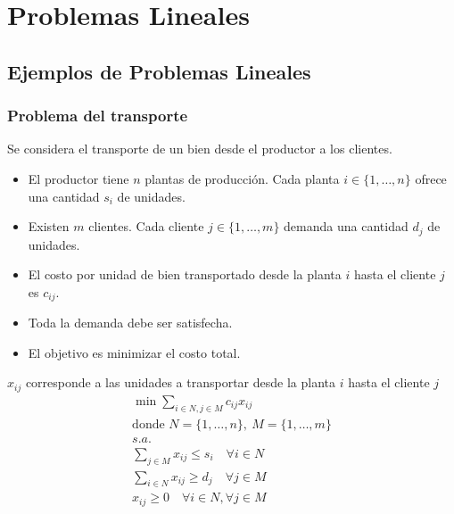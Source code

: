 \documentclass[../main.tex]{subfiles}
\begin{document}
\section{Problemas Lineales}
\subsection{Ejemplos de Problemas Lineales}
\subsubsection{Problema del transporte}
Se considera el transporte de un bien desde el productor a los clientes.\\
\begin{minipage}[t]{.45\textwidth}
  \begin{itemize}
    \item El productor tiene $n$ plantas de producción. Cada planta $i \in \{ 1, \ldots, n \}$ ofrece una cantidad $s_i$ de unidades.
    \item Existen $m$ clientes. Cada cliente $j \in \{ 1, \ldots, m \}$ demanda una cantidad $d_j$ de unidades.
    \item El costo por unidad de bien transportado desde la planta $i$ hasta el cliente $j$ es $c_{ij}$.
    \item Toda la demanda debe ser satisfecha.
    \item El objetivo es minimizar el costo total.
  \end{itemize}
\end{minipage}
\hfill
\begin{minipage}[t]{.45\textwidth}
  $x_{ij}$ corresponde a las unidades a transportar desde la planta $i$ hasta el cliente $j$
  \begin{gather*}
    \min \sum_{i \in N, j \in M} c_{ij} x_{ij} \\
    \text{donde } N = \{ 1, \ldots, n \},\ M = \{ 1, \ldots, m \}\\
    s.a.\\
    \sum_{j \in M} x_{ij} \leq s_i \quad \forall i \in N\\
    \sum_{i \in N} x_{ij} \geq d_j \quad \forall j \in M\\
    x_{ij} \geq 0 \quad \forall i \in N, \forall j \in M
  \end{gather*}
\end{minipage}
\end{document}
